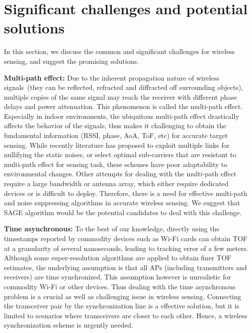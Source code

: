 \section{Significant challenges and potential solutions}
In this section, we discuss the common and significant challenges for wireless sensing, and suggest the promising solutions.

\textbf{Multi-path effect:}  Due to the inherent propagation nature of wireless signals~(they can be reflected, refracted and diffracted off surrounding objects), multiple copies of the same signal may reach the receiver with different phase delays and power attenuation. This phenomenon is called the multi-path effect. Especially in indoor environments, the ubiquitous multi-path effect drastically affects the behavior of the signals, thus makes it challenging to obtain the fundamental information (RSSI, phase, AoA, ToF, etc) for accurate target sensing. While recently literature has proposed to exploit multiple links for nullifying the static noises, or select optimal sub-carriers that are resistant to multi-path effect for sensing task, these schemes have poor adaptability to environmental changes. Other attempts for dealing with the multi-path effect require a large bandwidth or antenna array, which either require dedicated devices or is difficult to deploy. Therefore, there is a need for effective multi-path and noise suppressing algorithms in accurate wireless sensing. We suggest that SAGE algorithm would be the potential candidates to deal with this challenge.

\textbf{Time asynchronous:} To the best of our knowledge, directly using the timestamps reported by commodity devices such as Wi-Fi cards can obtain TOF at a granularity of several nanoseconds, leading to tracking error of a few meters. Although some super-resolution algorithms are applied to obtain finer TOF estimates, the underlying assumption is that all APs (including transmitters and receivers) are time synchronized. This assumption however is unrealistic for commodity Wi-Fi or other devices. Thus dealing with the time asynchronous problem is a crucial as well as challenging issue in wireless sensing. Connecting the transceiver pair by the synchronization line is a effective solution, but it is limited to scenarios where transceivers are closer to each other. Hence, a wireless synchronization scheme is urgently needed.

